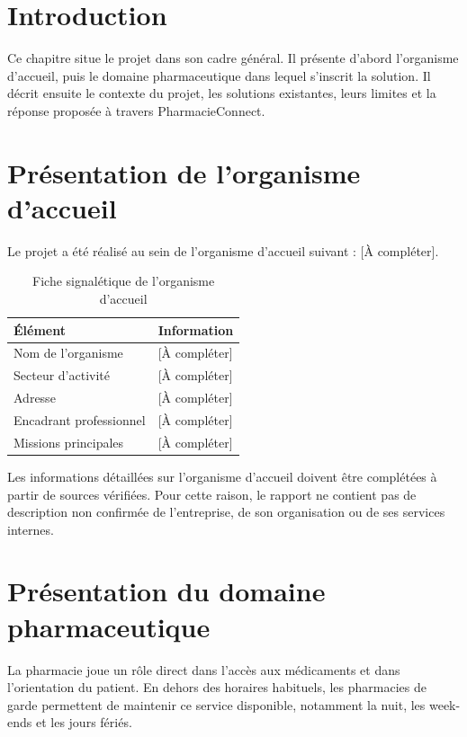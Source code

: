 \section{Introduction}

Ce chapitre situe le projet dans son cadre général. Il présente d'abord l'organisme d'accueil, puis le
domaine pharmaceutique dans lequel s'inscrit la solution. Il décrit ensuite le contexte du projet, les
solutions existantes, leurs limites et la réponse proposée à travers PharmacieConnect.

\section{Présentation de l'organisme d'accueil}

Le projet a été réalisé au sein de l'organisme d'accueil suivant : [À compléter].

\begin{table}[H]
    \centering
    \caption{Fiche signalétique de l'organisme d'accueil}
    \begin{tabular}{L{5cm}L{8cm}}
        \toprule
        \textbf{Élément} & \textbf{Information} \\
        \midrule
        Nom de l'organisme & [À compléter] \\
        Secteur d'activité & [À compléter] \\
        Adresse & [À compléter] \\
        Encadrant professionnel & [À compléter] \\
        Missions principales & [À compléter] \\
        \bottomrule
    \end{tabular}
\end{table}

Les informations détaillées sur l'organisme d'accueil doivent être complétées à partir de sources
vérifiées. Pour cette raison, le rapport ne contient pas de description non confirmée de l'entreprise, de
son organisation ou de ses services internes.

\section{Présentation du domaine pharmaceutique}

La pharmacie joue un rôle direct dans l'accès aux médicaments et dans l'orientation du patient. En dehors
des horaires habituels, les pharmacies de garde permettent de maintenir ce service disponible, notamment
la nuit, les week-ends et les jours fériés.

